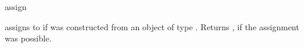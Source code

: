 \begin{ccRefFunction}{assign}


       {assigns  to  if 
        was constructed from an object of type .
        Returns , if the assignment was possible.}
\end{ccRefFunction}

